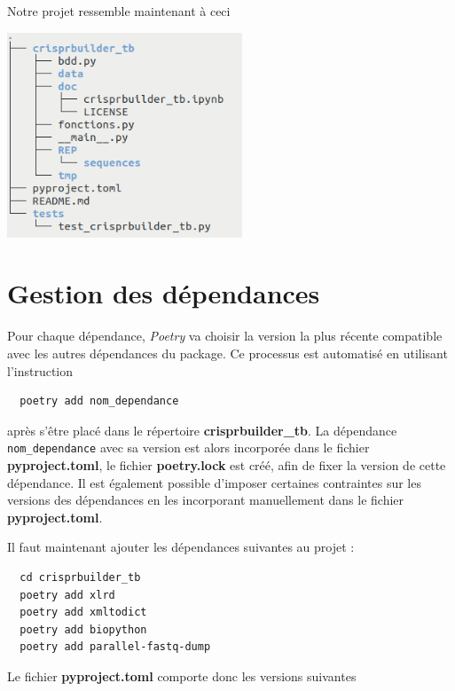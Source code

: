 \documentclass[twoside,a4paper,11pt,frenchb,openany]{report}
\begin{document}
Notre projet ressemble maintenant à ceci

\includegraphics[width=7cm]{crispr_etape2.png}









\section{Gestion des dépendances}

Pour chaque dépendance, \textit{Poetry} va choisir la version la plus récente compatible avec les autres dépendances du package. Ce processus est automatisé en utilisant l'instruction 

\begin{verbatim}
  poetry add nom_dependance
\end{verbatim}

après s'être placé dans le répertoire \textbf{crisprbuilder\_tb}. La dépendance \texttt{nom\_dependance} avec sa version est alors incorporée dans le fichier \textbf{pyproject.toml}, le fichier \textbf{poetry.lock} est créé, afin de fixer la version de cette dépendance. Il est également possible d’imposer certaines contraintes sur les versions des dépendances en les incorporant manuellement dans le fichier \textbf{pyproject.toml}.

Il faut maintenant ajouter les dépendances suivantes au projet :
\begin{verbatim}  cd crisprbuilder_tb 
  poetry add xlrd 
  poetry add xmltodict 
  poetry add biopython
  poetry add parallel-fastq-dump \end{verbatim}

Le fichier \textbf{pyproject.toml} comporte donc les versions suivantes
\end{document}
